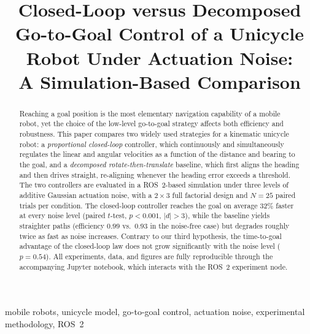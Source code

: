 \documentclass[conference]{IEEEtran}
\begin{document}
\title{Closed-Loop versus Decomposed Go-to-Goal Control of a Unicycle Robot
Under Actuation Noise:\\ A Simulation-Based Comparison}

\author{
}

\maketitle

\begin{abstract}
Reaching a goal position is the most elementary navigation capability of a
mobile robot, yet the choice of the low-level go-to-goal strategy affects both
efficiency and robustness. This paper compares two widely used strategies for a
kinematic unicycle robot: a \emph{proportional closed-loop} controller, which
continuously and simultaneously regulates the linear and angular velocities as
a function of the distance and bearing to the goal, and a \emph{decomposed
rotate-then-translate} baseline, which first aligns the heading and then
drives straight, re-aligning whenever the heading error exceeds a threshold.
The two controllers are evaluated in a ROS~2-based simulation under three
levels of additive Gaussian actuation noise, with a $2\times3$ full factorial
design and $N=25$ paired trials per condition. The closed-loop controller
reaches the goal on average 32\% faster at every noise level (paired
$t$-test, $p<0.001$, $|d|>3$), while the baseline yields straighter paths
(efficiency $0.99$ vs.\ $0.93$ in the noise-free case) but degrades roughly
twice as fast as noise increases. Contrary to our third hypothesis, the
time-to-goal advantage of the closed-loop law does not grow significantly
with the noise level ($p=0.54$). All experiments, data, and figures are fully
reproducible through the accompanying Jupyter notebook, which interacts with
the ROS~2 experiment node.
\end{abstract}

\begin{IEEEkeywords}
mobile robots, unicycle model, go-to-goal control, actuation noise,
experimental methodology, ROS~2
\end{IEEEkeywords}
\end{document}

